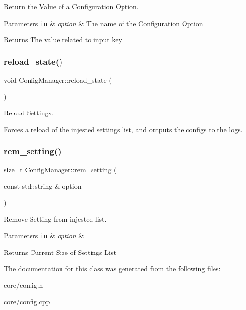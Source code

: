 Return the Value of a Configuration Option. 


\begin{DoxyParams}[1]{Parameters}
\mbox{\tt in}  & {\em option} & The name of the Configuration Option \\
\hline
\end{DoxyParams}
\begin{DoxyReturn}{Returns}
The value related to input key 
\end{DoxyReturn}
\mbox{\label{classConfigManager_ad9571dcb459dc4e5f8da36106de0be8a}} 
\subsubsection{\texorpdfstring{reload\+\_\+state()}{reload\_state()}}
{\footnotesize\ttfamily void Config\+Manager\+::reload\+\_\+state (\begin{DoxyParamCaption}{ }\end{DoxyParamCaption})}



Reload Settings. 

Forces a reload of the injested settings list, and outputs the configs to the logs. \mbox{\label{classConfigManager_afa581faf4c9329722a807cdb49e14381}} 
\subsubsection{\texorpdfstring{rem\+\_\+setting()}{rem\_setting()}}
{\footnotesize\ttfamily size\+\_\+t Config\+Manager\+::rem\+\_\+setting (\begin{DoxyParamCaption}\item[{const std\+::string \&}]{option }\end{DoxyParamCaption})}



Remove Setting from injested list. 


\begin{DoxyParams}[1]{Parameters}
\mbox{\tt in}  & {\em option} & \\
\hline
\end{DoxyParams}
\begin{DoxyReturn}{Returns}
Current Size of Settings List 
\end{DoxyReturn}


The documentation for this class was generated from the following files\+:\begin{DoxyCompactItemize}
\item 
core/config.\+h\item 
core/config.\+cpp\end{DoxyCompactItemize}
